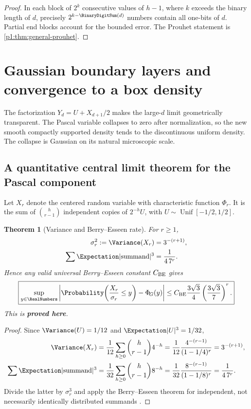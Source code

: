 \documentclass[11pt,oneside]{article}
\numberwithin{equation}{section}
\newtheorem{theorem}{Theorem}[section]
\theoremstyle{definition}
\theoremstyle{remark}
\newcommand{\statusproved}{\textcolor{deepgreen}{\textbf{proved here}}}
\newcommand{\NormalCDF}{\Phi_{\!G}}
\begin{document}
\begin{proof}
In each block of $2^k$ consecutive values of $h-1$, where $k$ exceeds the binary length of
$d$, precisely $2^{k-\BinaryDigitSum(d)}$ numbers contain all one-bits of $d$.  Partial end blocks account
for the bounded error.  The Prouhet statement is \cref{p1:thm:general-prouhet}.
\end{proof}


\section{Gaussian boundary layers and convergence to a box density}
\label{p1:sec:boundary}

The factorization $Y_d=U+X_{d+1}/2$ makes the large-$d$ limit geometrically transparent.
The Pascal variable collapses to zero after normalization, so the new smooth compactly
supported density tends to the discontinuous uniform density.  The collapse is Gaussian on
its natural microscopic scale.

\subsection{A quantitative central limit theorem for the Pascal component}

Let $X_r$ denote the centered random variable with characteristic function $\Phi_r$.  It is
the sum of $\binom h{r-1}$ independent copies of $2^{-h}U$, with
$U\sim\operatorname{Unif}[-1/2,1/2]$.

\begin{theorem}[Variance and Berry--Esseen rate]
\label{p1:thm:pascal-BE}
For $r\ge1$,
\begin{align}
 \sigma_r^2:=\Variance(X_r)&=3^{-(r+1)},
 \label{p1:eq:pascal-variance}\\
 \sum\Expectation|\text{summand}|^3&=\frac1{4\,7^r}.
 \label{p1:eq:pascal-third-sum}
\end{align}
Hence any valid universal Berry--Esseen constant $C_{\rm BE}$ gives
\begin{equation}
 \boxed{
 \sup_{y\in\RealNumbers}
 \left|\Probability\!\left(\frac{X_r}{\sigma_r}\le y\right)-\NormalCDF(y)\right|
 \le C_{\rm BE}\frac{3\sqrt3}{4}
       \left(\frac{3\sqrt3}{7}\right)^r.}
 \label{p1:eq:pascal-BE}
\end{equation}
This is \statusproved.
\end{theorem}

\begin{proof}
Since $\Variance(U)=1/12$ and $\Expectation|U|^3=1/32$,
\begin{align*}
 \Variance(X_r)
 &=\frac1{12}\sum_{h\ge0}\binom h{r-1}4^{-h}
 =\frac1{12}\frac{4^{-(r-1)}}{(1-1/4)^r}
 =3^{-(r+1)},\\
 \sum\Expectation|\text{summand}|^3
 &=\frac1{32}\sum_{h\ge0}\binom h{r-1}8^{-h}
 =\frac1{32}\frac{8^{-(r-1)}}{(1-1/8)^r}
 =\frac1{4\,7^r}.
\end{align*}
Divide the latter by $\sigma_r^3$ and apply the Berry--Esseen theorem for independent,
not necessarily identically distributed summands \cite{p1:petrov1995}.
\end{proof}
\end{document}

